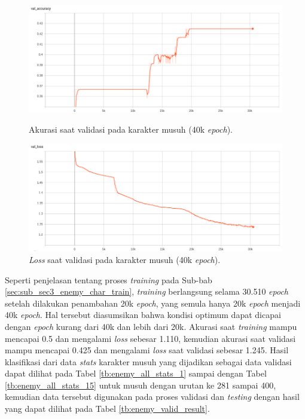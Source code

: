 \begin{figure} [!h] \centering
	\includegraphics[scale=0.42]{img/enemy_val_acc_40k_chap4.png}
	\caption{Akurasi saat validasi pada karakter musuh (40k \textit{epoch}).}
	\label{fig:nn_enemy_val_acc_40k_chap4}
	\vspace{4ex}
	
	\includegraphics[scale=0.42]{img/enemy_val_loss_40k_chap4.png}
	\caption{\textit{Loss} saat validasi pada karakter musuh (40k \textit{epoch}).}
	\label{fig:nn_enemy_val_loss_40k_chap4}
\end{figure}

Seperti penjelasan tentang proses \textit{training} pada Sub-bab \ref{sec:sub_sec3_enemy_char_train}, \textit{training} berlangsung selama 30.510 \textit{epoch} setelah dilakukan penambahan 20k \textit{epoch}, yang semula hanya 20k \textit{epoch} menjadi 40k \textit{epoch}. Hal tersebut diasumsikan bahwa kondisi optimum dapat dicapai dengan \textit{epoch} kurang dari 40k dan lebih dari 20k. Akurasi saat \textit{training} mampu mencapai 0.5 dan mengalami \textit{loss} sebesar 1.110, kemudian akurasi saat validasi mampu mencapai 0.425 dan mengalami \textit{loss} saat validasi sebesar 1.245. Hasil klasifikasi dari data \textit{stats} karakter musuh yang dijadikan sebagai data validasi dapat dilihat pada Tabel \ref{tb:enemy_all_stats_1} sampai dengan Tabel \ref{tb:enemy_all_stats_15} untuk musuh dengan urutan ke 281 sampai 400, kemudian data tersebut digunakan pada proses validasi dan \textit{testing} dengan hasil yang dapat dilihat pada Tabel \ref{tb:enemy_valid_result}.
\vspace{-2ex}

